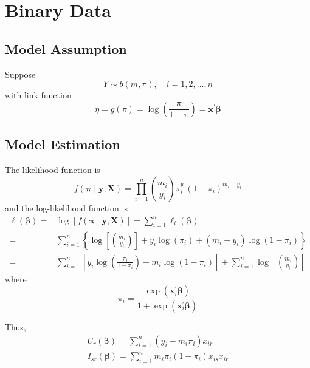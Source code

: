 \chapter{Binary Data}

\section{Model Assumption}

Suppose
\begin{equation}
    Y\sim b\left(m,\pi\right),\quad i=1,2,\ldots,n
\end{equation}
with link function
\begin{equation}
    \eta=g\left(\pi\right)=\log\left(\frac{\pi}{1-\pi}\right)=\mathbf{x}^{\prime}\boldsymbol{\beta}
\end{equation}

\section{Model Estimation}

The likelihood function is
\begin{equation}
    f\left(\boldsymbol{\pi}\mid\mathbf{y},\mathbf{X}\right)=\prod_{i=1}^{n}\binom{m_{i}}{y_{i}}\pi_{i}^{y_{i}}\left(1-\pi_{i}\right)^{m_{i}-y_{i}}
\end{equation}
and the log-likelihood function is
\begin{equation}
    \begin{aligned}
        \ell\left(\boldsymbol{\beta}\right)= & \log\left[f\left(\boldsymbol{\pi}\mid\mathbf{y},\mathbf{X}\right)\right]=\sum_{i=1}^{n}\ell_{i}\left(\boldsymbol{\beta}\right)                                 \\
        =                                    & \sum_{i=1}^{n}\left\{\log\left[\binom{m_{i}}{y_{i}}\right]+y_{i}\log\left(\pi_{i}\right)+\left(m_{i}-y_{i}\right)\log\left(1-\pi_{i}\right)\right\}            \\
        =                                    & \sum_{i=1}^{n}\left[y_{i}\log\left(\frac{\pi_{i}}{1-\pi_{i}}\right)+m_{i}\log\left(1-\pi_{i}\right)\right]+\sum_{i=1}^{n}\log\left[\binom{m_{i}}{y_{i}}\right]
    \end{aligned}
\end{equation}
where
\begin{equation}
    \pi_{i}=\frac{\exp\left(\mathbf{x}_{i}^{\prime}\boldsymbol{\beta}\right)}{1+\exp\left(\mathbf{x}_{i}^{\prime}\boldsymbol{\beta}\right)}
\end{equation}

Thus,
\begin{gather*}
    U_{r}\left(\boldsymbol{\beta}\right)=\sum_{i=1}^{n}\left(y_{i}-m_{i}\pi_{i}\right)x_{ir} \\
    I_{sr}\left(\boldsymbol{\beta}\right)=\sum_{i=1}^{n}m_{i}\pi_{i}\left(1-\pi_{i}\right)x_{is}x_{ir}
\end{gather*}